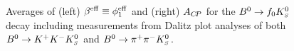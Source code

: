 \begin{figure}[htb]
  \begin{center}
    \hfill
  \end{center}
  \vspace{-0.8cm}
  \caption{
    Averages of 
    (left) $\beta^{\rm eff} \equiv \phi_1^{\rm eff}$ and (right) $A_{C\!P}$
    for the $B^0\to f_0K^0_{\scriptscriptstyle S}$ decay including measurements from Dalitz plot analyses of both $B^0\to K^+K^-K^0_{\scriptscriptstyle S}$ and $B^0\to \pi^+\pi^-K^0_{\scriptscriptstyle S}$.
  }
  \label{fig:cp_uta:qqs:f0KS}
\end{figure}

